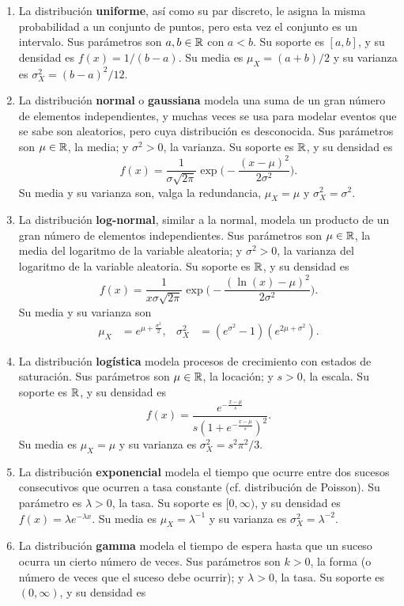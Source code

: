 \begin{enumerate}
	\item La distribución \textbf{uniforme}, así como su par discreto, le asigna la misma probabilidad a un conjunto de puntos, pero esta vez el conjunto es un intervalo. Sus parámetros son \(a, b \in \mathbb{R}\) con \(a < b\). Su soporte es \([a, b]\), y su densidad es \(f(x) = 1 / (b-a)\). Su media es \(\mu_X = (a+b) / 2\) y su varianza es \(\sigma^2_X = (b-a)^2 / 12\).
	\item La distribución \textbf{normal} o \textbf{gaussiana} modela una suma de un gran número de elementos independientes, y muchas veces se usa para modelar eventos que se sabe son aleatorios, pero cuya distribución es desconocida. Sus parámetros son \(\mu \in \mathbb{R}\), la media; y \(\sigma^2 > 0\), la varianza. Su soporte es \(\mathbb{R}\), y su densidad es
	\[f(x) = \frac{1}{\sigma \sqrt{2\pi}} \exp\biggl(-\frac{(x - \mu)^2}{2 \sigma^2}\biggr).\]
	Su media y su varianza son, valga la redundancia, \(\mu_X = \mu\) y \(\sigma^2_X = \sigma^2\).
	\item La distribución \textbf{log-normal}, similar a la normal, modela un producto de un gran número de elementos independientes. Sus parámetros son \(\mu \in \mathbb{R}\), la media del logaritmo de la variable aleatoria; y \(\sigma^2 > 0\), la varianza del logaritmo de la variable aleatoria. Su soporte es \(\mathbb{R}\), y su densidad es
	\[f(x) = \frac{1}{x \sigma \sqrt{2\pi}} \exp\biggl(-\frac{(\ln(x) - \mu)^2}{2 \sigma^2}\biggr).\]
	Su media y su varianza son
	\begin{align*}
		\mu_X	&= e^{\mu + \frac{\sigma^2}{2}},	& \sigma^2_X &= (e^{\sigma^2}-1)(e^{2\mu + \sigma^2}).
	\end{align*}
	\item La distribución \textbf{logística} modela procesos de crecimiento con estados de saturación. Sus parámetros son \(\mu \in \mathbb{R}\), la locación; y \(s > 0\), la escala. Su soporte es \(\mathbb{R}\), y su densidad es
	\[f(x) = \frac{e^{-\frac{x-\mu}{s}}}{s(1+e^{-\frac{x-\mu}{s}})^2}.\]
	Su media es \(\mu_X = \mu\) y su varianza es \(\sigma_X^2 = s^2 \pi^2 / 3\).
	\item La distribución \textbf{exponencial} modela el tiempo que ocurre entre dos sucesos consecutivos que ocurren a tasa constante (cf. distribución de Poisson). Su parámetro es \(\lambda > 0\), la tasa. Su soporte es \([0, \infty)\), y su densidad es \(f(x) = \lambda e^{-\lambda x}\). Su media es \(\mu_X = \lambda^{-1}\) y su varianza es \(\sigma_X^2 = \lambda^{-2}\).
	\item La distribución \textbf{gamma} modela el tiempo de espera hasta que un suceso ocurra un cierto número de veces. Sus parámetros son \(k > 0\), la forma (o número de veces que el suceso debe ocurrir); y \(\lambda > 0\), la tasa. Su soporte es \((0, \infty)\), y su densidad es

\end{enumerate}
